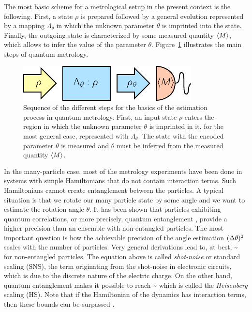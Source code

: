 The most basic scheme for a metrological setup in the present context is the following.
First, a state $\rho$ is prepared followed by a general evolution represented by a mapping $\Lambda_{\theta}$ in which the unknown parameter $\theta$ is imprinted into the state.
Finally, the outgoing state is characterized by some measured quantity $\langle{M}\rangle$, which allows to infer the value of the parameter $\theta$.
Figure~\ref{fig:bg-preparation-encoding-estimation} illustrates the main steps of quantum metrology.
\begin{figure}[htp]
  \centering
  \includegraphics[scale=1.2]{img/BG_preparation_encoding_estimation.pdf}
  \caption[The estimation process in quantum metrology]{Sequence of the different steps for the basics of the estimation process in quantum metrology. First, an input state $\rho$ enters the region in which the unknown parameter $\theta$ is imprinted in it, for the most general case, represented with $\Lambda_{\theta}$. The state with the encoded parameter $\theta$ is measured and $\theta$ must be inferred from the measured quantity $\langle{M}\rangle$.}
  \label{fig:bg-preparation-encoding-estimation}
\end{figure}

In the many-particle case, most of the metrology experiments have been done in systems with simple Hamiltonians that do not contain interaction terms.
Such Hamiltonians cannot create entanglement between the particles.
A typical situation is that we rotate our many particle state by some angle and we want to estimate the rotation angle $\theta$.
It has been shown that particles exhibiting quantum correlations, or more precisely, quantum entanglement \cite{Guehne2009, Luis2004}, provide a higher precision than an ensemble with non-entangled particles.
The most important question is how the achievable precision of the angle estimation $(\Delta \theta )^2$ scales with the number of particles.
Very general derivations lead to, at best,
\be
  \label{eq:bg-shot-noise-scaling}
  \varian{\theta}\sim {}
\ee
for non-entangled particles.
The equation above is called \emph{shot-noise} or standard scaling (SNS), the term originating from the shot-noise in electronic circuits, which is due to the discrete nature of the electric charge.
On the other hand, quantum entanglement makes it possible to reach
\be
  \label{eq:bg-heisenberg-scaling}
  \varian{\theta}\sim {}
\ee
which is called the \emph{Heisenberg} scaling (HS).
Note that if the Hamiltonian of the dynamics has interaction terms, then these bounds can be surpassed \cite{Luis2004, Napolitano2011, Boixo2007, Braun2011, Roy2008, Choi2008, Rey2007}.

